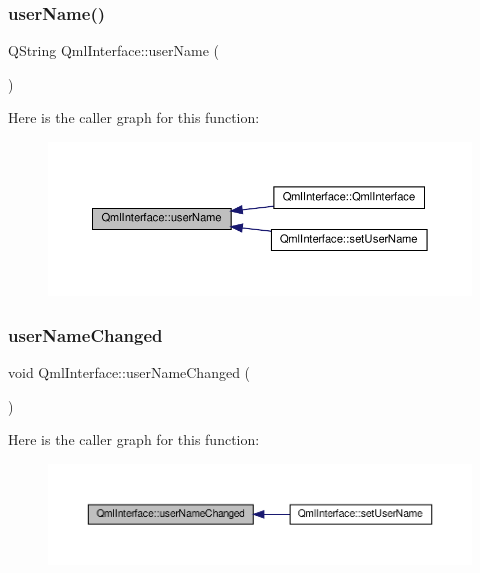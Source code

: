 \subsubsection{\texorpdfstring{user\+Name()}{userName()}}
{\footnotesize\ttfamily Q\+String Qml\+Interface\+::user\+Name (\begin{DoxyParamCaption}{ }\end{DoxyParamCaption})}

Here is the caller graph for this function\+:
\nopagebreak
\begin{figure}[H]
\begin{center}
\leavevmode
\includegraphics[width=350pt]{class_qml_interface_aec25299986ea1222d2bf1c358c92defc_icgraph}
\end{center}
\end{figure}
\mbox{\label{class_qml_interface_ad18453c22bf39b2cdc5dd0bcca5b1bd4}} 
\subsubsection{\texorpdfstring{user\+Name\+Changed}{userNameChanged}}
{\footnotesize\ttfamily void Qml\+Interface\+::user\+Name\+Changed (\begin{DoxyParamCaption}{ }\end{DoxyParamCaption})\hspace{0.3cm}{\ttfamily [signal]}}

Here is the caller graph for this function\+:
\nopagebreak
\begin{figure}[H]
\begin{center}
\leavevmode
\includegraphics[width=350pt]{class_qml_interface_ad18453c22bf39b2cdc5dd0bcca5b1bd4_icgraph}
\end{center}
\end{figure}


